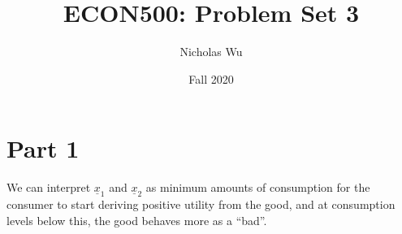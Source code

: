 \documentclass[10pt,letter]{article}
\begin{document}


\title{ECON500: Problem Set 3}

\author{Nicholas Wu}

\date{Fall 2020}

\maketitle


\section*{Part 1}
We can interpret $\underline{x}_1$ and $\underline{x}_2$ as minimum amounts of consumption for the consumer to start deriving positive utility from the good, and at consumption levels below this, the good behaves more as a ``bad''.
\end{document}
